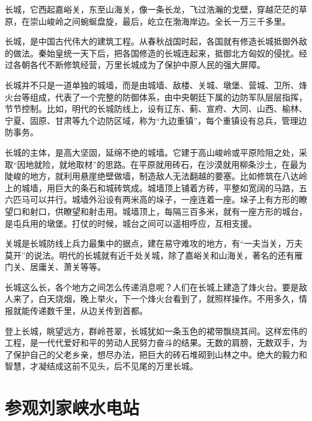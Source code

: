 \documentclass[12pt,UTF-8,openany]{ctexbook}
\begin{document}
\begin{large}
    
    长城，它西起嘉峪关，东至山海关，像一条长龙，飞过浩瀚的戈壁，穿越茫茫的草原，在崇山峻岭之间蜿蜒盘旋，最后，屹立在渤海岸边。全长一万三千多里。
    
    长城，是中国古代伟大的建筑工程。从春秋战国时起，各国就有修造长城抵御外敌的做法。秦始皇统一天下后，把各国修造的长城连起来，抵御北方匈奴的侵扰。经过各朝各代不断修筑经营，万里长城成为了保护中原人民的强大屏障。
    
    长城并不只是一道单独的城墙，而是由城墙、敌楼、关城、墩堡、营城、卫所、烽火台等组成，代表了一个完整的防御体系，由中央朝廷下属的边防军队层层指挥，节节控制。比如，明代的长城防线上，设有辽东、蓟、宣府、大同、山西、榆林、宁夏、固原、甘肃等九个边防区域，称为“九边重镇”，每个重镇设有总兵，管理边防事务。
    
    长城的主体，是高大坚固，延绵不绝的城墙。它建于高山峻岭或平原险阻之处，采取“因地就险，就地取材”的思路。在平原就用砖石，在沙漠就用柳条沙土，在最为陡峻的地方，就利用悬崖绝壁做墙，制造敌人无法翻越的要塞。比如修筑在八达岭上的城墙，用巨大的条石和城砖筑成。城墙顶上铺着方砖，平整如宽阔的马路，五六匹马可以并行。城墙外沿设有两米高的垛子，一座连着一座。垛子上有方形的瞭望口和射口，供瞭望和射击用。城墙顶上，每隔三百多米，就有一座方形的城台，是屯兵用的墩堡。打仗的时候，城台之间可以遥相呼应，互相支援。
    
    关城是长城防线上兵力最集中的据点，建在易守难攻的地方，有“一夫当关，万夫莫开”的说法。明代的长城就有近千处关城，除了嘉峪关和山海关，著名的还有雁门关、居庸关、萧关等等。
    
    长城这么长，各个地方之间怎么传递消息呢？人们在长城上建造了烽火台。要是敌人来了，白天烧烟，晚上举火，下一个烽火台看到了，就照样操作。不用多久，情报就能传递数千里，从边关传到首都。
    
    登上长城，眺望远方，群岭苍翠，长城犹如一条玉色的裙带飘绕其间。这样宏伟的工程，是一代代爱好和平的劳动人民努力奋斗的结果。无数的肩膀，无数双手，为了保护自己的父老乡亲，想尽办法，把巨大的砖石堆砌到山林之中。绝大的毅力和智慧，才凝结成这前不见头，后不见尾的万里长城。
    
\end{large}



\chapter{参观刘家峡水电站}
\end{document}
